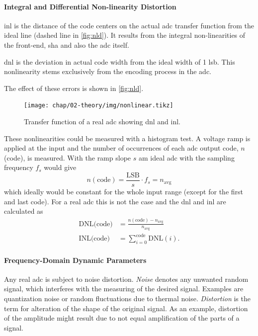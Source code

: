 \paragraph{Integral and Differential Non-linearity Distortion} 
\gls{inl} is the distance of the code centers on the actual \gls{adc} transfer function from the ideal line (dashed line in \autoref{fig:nld}). %
It results from the integral non-linearities of the front-end, \gls{sha} and also the \gls{adc} itself. \cite{walt, Lundberg}

\gls{dnl} is the deviation in actual code width from the ideal width of 1 \gls{lsb}. This nonlinearity stems exclusively from the encoding process in the \gls{adc}. \cite{Lundberg,walt} 

The effect of these errors is shown in \autoref{fig:nld}.
\begin{figure}[tbh]
	\centering
	\texttt{[image: chap/02-theory/img/nonlinear.tikz]}
	\caption[ADC Nonlinearities]{Transfer function of a real \gls{adc} showing \gls{dnl} and \gls{inl}.\cite{Lundberg}}
	\label{fig:nld}
\end{figure}

These nonlinearities could be measured with a histogram test.
A voltage ramp is applied at the input and the number of occurrences of each \gls{adc} output code, $n$(code), is measured.
With the ramp slope $s$ am ideal \gls{adc} with the sampling frequency $f_s$ would give
\begin{equation}
	n(\text{code}) = \frac{\text{LSB}}{s} \cdot f_s = n_\text{avg}
\end{equation}
which ideally would be constant for the whole input range (except for the first and last code).
For a real \gls{adc} this is not the case and the \gls{dnl} and \gls{inl} are calculated as
\begin{align}
	\text{DNL(code)} &= \frac{n(\text{code})-n_\text{avg}}{n_\text{avg}}\\
	\text{INL(code)} &= \sum_{i = 0}^{\text{code}} \text{DNL}(i).
\end{align}
\cite{inlDnl}

\paragraph{Frequency-Domain Dynamic Parameters}
Any real \gls{adc} is subject to noise distortion. 
\textit{Noise} denotes any unwanted random signal, which interferes with the measuring of the desired signal. Examples are quantization noise or random fluctuations due to thermal noise. \textit{Distortion} is the term for alteration of the shape of the original signal. As an example, distortion of the amplitude might result due to not equal amplification of the parts of a signal. \cite{nd} %

